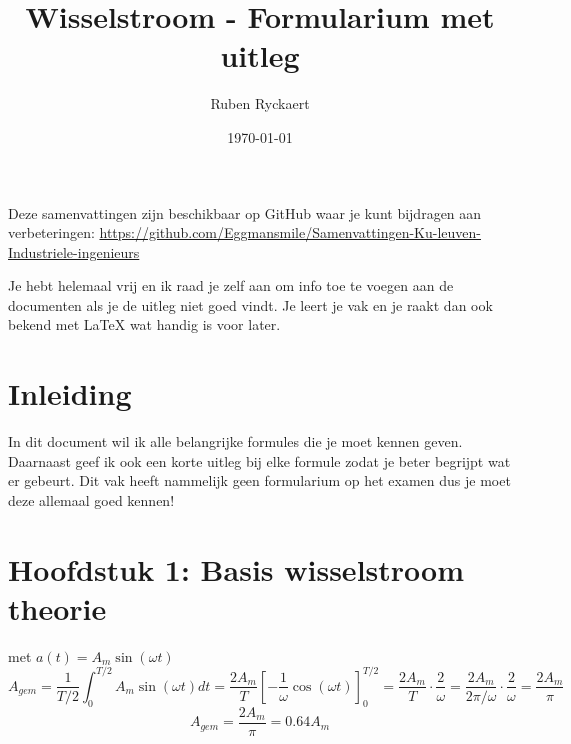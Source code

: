 \documentclass[a4paper,11pt]{article}
\title{Wisselstroom - Formularium met uitleg}
\author{Ruben Ryckaert}
\date{\today}
\begin{document}
\maketitle
Deze samenvattingen zijn beschikbaar op GitHub waar je kunt bijdragen aan verbeteringen:
 \url{https://github.com/Eggmansmile/Samenvattingen-Ku-leuven-Industriele-ingenieurs}

Je hebt helemaal vrij en ik raad je zelf aan om info toe te voegen aan de documenten als je de uitleg niet goed vindt.
Je leert je vak en je raakt dan ook bekend met LaTeX wat handig is voor later.
\tableofcontents
\printformularium
\newpage

\section{Inleiding}

In dit document wil ik alle belangrijke formules die je moet kennen geven.
Daarnaast geef ik ook een korte uitleg bij elke formule zodat je beter begrijpt wat er gebeurt.
Dit vak heeft nammelijk geen formularium op het examen
dus je moet deze allemaal goed kennen!

\section{Hoofdstuk 1: Basis wisselstroom theorie}







met $a(t) = A_m \sin(\omega t)$
\[A_{gem} = \frac{1}{T/2} \int_0^{T/2} A_m \sin(\omega t) dt = \frac{2 A_m}{T} \left[ -\frac{1}{\omega} \cos(\omega t)
\right]_0^{T/2} = \frac{2 A_m}{T} \cdot \frac{2}{\omega} = \frac{2 A_m}{2\pi / \omega} \cdot \frac{2}{\omega} = \frac{2 A_m}{\pi}\]
\[A_{gem} = \frac{2 A_m}{\pi} = 0.64A_m\]
\end{document}
